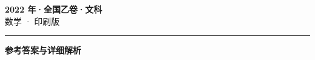 \documentclass[zihao=5, a4paper]{ctexart}
\begin{document}
\begin{center}
  {\Large\bfseries 2022 年·全国乙卷·文科}\\[4pt]
  {\large 数学 · 印刷版}
\end{center}
\medskip
{}

\par\bigskip\hrule\bigskip
{}
\begin{center}{\large\bfseries 参考答案与详细解析}\end{center}
\smallskip

\end{document}
